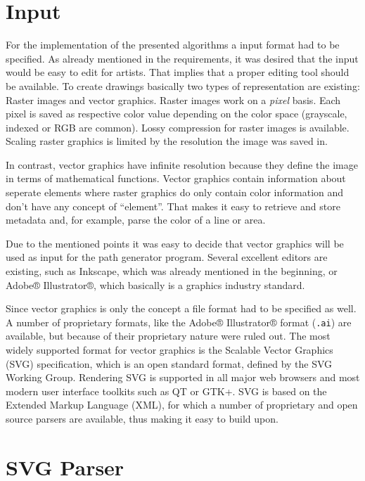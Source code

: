 \documentclass[10pt,twoside,a4paper]{report}
\begin{document}
\section{Input}	%
For the implementation of the presented algorithms a input format had to be specified. As already mentioned in the requirements, it was desired that the input would be easy to edit for artists. That implies that a proper editing tool should be available. To create drawings basically two types of representation are existing: Raster images and vector graphics. Raster images work on a \textit{pixel} basis. Each pixel is saved as respective color value depending on the color space (grayscale, indexed or RGB are common). Lossy compression for raster images is available. Scaling raster graphics is limited by the resolution the image was saved in.

In contrast, vector graphics have infinite resolution because they define the image in terms of mathematical functions. Vector graphics contain information about seperate elements where raster graphics do only contain color information and don't have any concept of \enquote{element}. That makes it easy to retrieve and store metadata and, for example, parse the color of a line or area.

Due to the mentioned points it was easy to decide that vector graphics will be used as input for the path generator program. Several excellent editors are existing, such as Inkscape, which was already mentioned in the beginning, or Adobe® Illustrator®, which basically is a graphics industry standard.

Since vector graphics is only the concept a file format had to be specified as well. A number of proprietary formats, like the Adobe® Illustrator® format (\texttt{.ai}) are available, but because of their proprietary nature were ruled out. The most widely supported format for vector graphics is the Scalable Vector Graphics (SVG) specification, which is an open standard format, defined by the SVG Working Group\cite{svgstandard}. Rendering SVG is supported in all major web browsers and most modern user interface toolkits such as QT or GTK+. SVG is based on the Extended Markup Language (XML), for which a number of proprietary and open source parsers are available, thus making it easy to build upon.

\section{SVG Parser}
\end{document}
